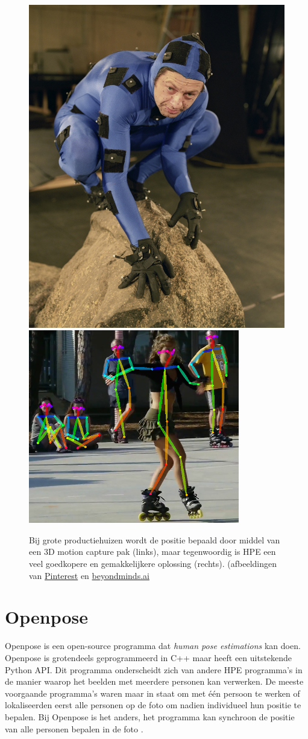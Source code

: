 \documentclass[a4paper,twoside,kulak]{kulakreport}
\begin{document}
	\begin{figure}[H]
		\includegraphics[width=.4\textwidth]{3D_motion_capture}
		\includegraphics[width=.55\textwidth]{HPE_voorbeeld}
		\caption{Bij grote productiehuizen wordt de positie bepaald door middel van een 3D motion capture pak (links), maar tegenwoordig is HPE een veel goedkopere en gemakkelijkere oplossing (rechts).
		(afbeeldingen van \href{https://www.pinterest.com/pin/718324209297102981/}{Pinterest} en \href{https://beyondminds.ai/an-overview-of-human-pose-estimation-with-deep-learning/}{beyondminds.ai}}
		\label{3D_pak}
	\end{figure}

\section{Openpose}
Openpose is een open-source programma dat \emph{human pose estimations} kan doen. Openpose is grotendeels geprogrammeerd in C++ maar heeft een uitstekende Python API. Dit programma onderscheidt zich van andere HPE programma's in de manier waarop het beelden met meerdere personen kan verwerken. De meeste voorgaande programma's waren maar in staat om met één persoon te werken of lokaliseerden eerst alle personen op de foto om nadien individueel hun positie te bepalen. Bij Openpose is het anders, het programma kan synchroon de positie van alle personen bepalen in de foto \cite{openpose}.
\end{document}
